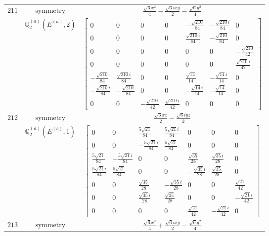 \documentclass[fleqn,8pt,landscape]{jsarticle}
\begin{document}
\begin{longtable}{ccc}
$ 211 $ & $ \text{symmetry} $ & $ \frac{\sqrt{6} x^{2}}{4} - \frac{\sqrt{6} i x y}{2} - \frac{\sqrt{6} y^{2}}{4} $ \\
$  $ & $ \mathbb{Q}_{2}^{(a)}(E^{(a)},2) $ & $ \begin{bmatrix} 0 & 0 & 0 & 0 & - \frac{\sqrt{210}}{84} & - \frac{\sqrt{210} i}{84} & 0 \\ 0 & 0 & 0 & 0 & \frac{\sqrt{210} i}{84} & - \frac{\sqrt{210}}{84} & 0 \\ 0 & 0 & 0 & 0 & 0 & 0 & - \frac{\sqrt{210}}{42} \\ 0 & 0 & 0 & 0 & 0 & 0 & \frac{\sqrt{210} i}{42} \\ - \frac{\sqrt{210}}{84} & \frac{\sqrt{210} i}{84} & 0 & 0 & \frac{\sqrt{14}}{14} & - \frac{\sqrt{14} i}{14} & 0 \\ - \frac{\sqrt{210} i}{84} & - \frac{\sqrt{210}}{84} & 0 & 0 & - \frac{\sqrt{14} i}{14} & - \frac{\sqrt{14}}{14} & 0 \\ 0 & 0 & - \frac{\sqrt{210}}{42} & \frac{\sqrt{210} i}{42} & 0 & 0 & 0 \end{bmatrix} $ \\ \hline
$ 212 $ & $ \text{symmetry} $ & $ \frac{\sqrt{6} x z}{2} - \frac{\sqrt{6} i y z}{2} $ \\
$  $ & $ \mathbb{Q}_{2}^{(a)}(E^{(b)},1) $ & $ \begin{bmatrix} 0 & 0 & \frac{5 \sqrt{21}}{84} & \frac{5 \sqrt{21} i}{84} & 0 & 0 & 0 \\ 0 & 0 & - \frac{5 \sqrt{21} i}{84} & \frac{5 \sqrt{21}}{84} & 0 & 0 & 0 \\ \frac{5 \sqrt{21}}{84} & - \frac{5 \sqrt{21} i}{84} & 0 & 0 & \frac{\sqrt{35}}{28} & \frac{\sqrt{35} i}{28} & 0 \\ \frac{5 \sqrt{21} i}{84} & \frac{5 \sqrt{21}}{84} & 0 & 0 & - \frac{\sqrt{35} i}{28} & \frac{\sqrt{35}}{28} & 0 \\ 0 & 0 & \frac{\sqrt{35}}{28} & - \frac{\sqrt{35} i}{28} & 0 & 0 & \frac{\sqrt{21}}{42} \\ 0 & 0 & \frac{\sqrt{35} i}{28} & \frac{\sqrt{35}}{28} & 0 & 0 & - \frac{\sqrt{21} i}{42} \\ 0 & 0 & 0 & 0 & \frac{\sqrt{21}}{42} & - \frac{\sqrt{21} i}{42} & 0 \end{bmatrix} $ \\ \hline
$ 213 $ & $ \text{symmetry} $ & $ \frac{\sqrt{6} x^{2}}{4} + \frac{\sqrt{6} i x y}{2} - \frac{\sqrt{6} y^{2}}{4} $ \\

\end{longtable}
\end{document}
